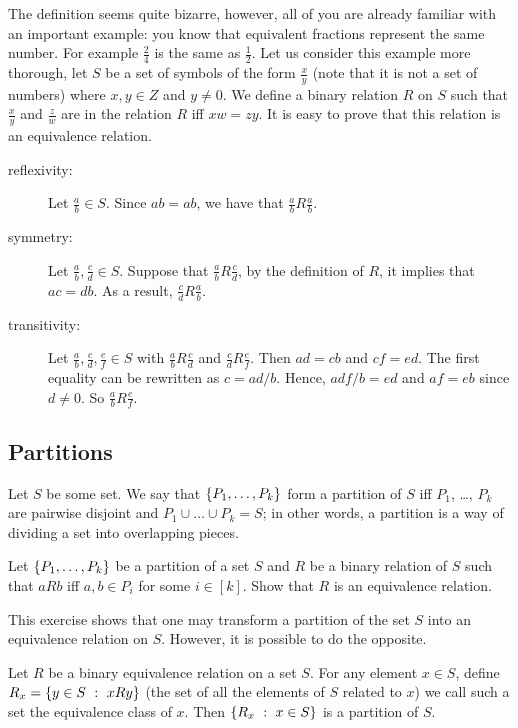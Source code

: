 The definition seems quite bizarre, however, all of you are already familiar
with an important example: you know that equivalent fractions represent the
same number. For example $\frac{2}{4}$ is the same as $\frac{1}{2}$.
Let us consider this example more thorough, let $S$ be a set of symbols of the
form $\frac{x}{y}$ (note that it is not a set of numbers) where $x, y \in Z$
and $y \neq 0$. We define a binary relation $R$ on $S$ such that
$\frac{x}{y}$ and $\frac{z}{w}$ are in the relation $R$ iff $xw = zy$.
It is easy to prove that this relation is an equivalence relation.
\begin{description}
  \item[reflexivity:] Let $\frac{a}{b} \in S$. Since $ab = ab$, we have that
    $\frac{a}{b} R \frac{a}{b}$.
  \item[symmetry:] Let $\frac{a}{b}, \frac{c}{d} \in S$. Suppose that
    $\frac{a}{b} R \frac{c}{d}$, by the definition of $R$, it implies that
    $ac = db$. As a result, $\frac{c}{d} R \frac{a}{b}$.
  \item[transitivity:] Let $\frac{a}{b}, \frac{c}{d}, \frac{e}{f} \in S$ with
    $\frac{a}{b} R \frac{c}{d}$ and $\frac{c}{d} R \frac{e}{f}$. Then
    $ad = cb$ and $cf = ed$. The first equality can be rewritten as $c = ad / b$.
    Hence, $adf / b = ed$ and $af = eb$ since $d \neq 0$. So $\frac{a}{b} R
    \frac{e}{f}$.
\end{description}

\subsection{Partitions}
Let $S$ be some set. We say that $\set{P_1, \dots, P_k}$ form a partition of
$S$ iff $P_1$, \dots, $P_k$ are pairwise disjoint and
$P_1 \cup \dots \cup P_k = S$; in other words, a partition is a way of dividing
a set into overlapping pieces.

\begin{exercise}
  Let $\set{P_1, \dots, P_k}$ be a partition of a set $S$ and $R$ be a binary
  relation of $S$ such that $a R b$ iff $a, b \in P_i$ for some $i \in [k]$.
  Show that $R$ is an equivalence relation.
\end{exercise}

This exercise shows that one may transform a partition of the set $S$ into an
equivalence relation on $S$. However, it is possible to do the opposite.
\begin{theorem}
\label{theorem:partition}
  Let $R$ be a binary equivalence relation on a set $S$. For any element $x \in
  S$, define $R_x = \set[x R y]{y \in S}$ (the set of all the elements of $S$
  related to $x$) we call such a set the equivalence class of $x$.
  Then $\set[x \in S]{R_x}$ is a partition of $S$.
\end{theorem}


